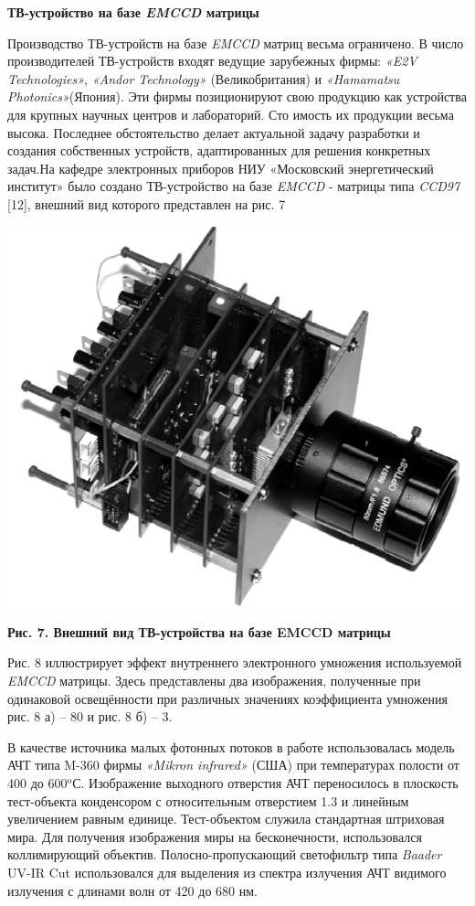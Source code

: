 \documentclass[11pt]{article}
\begin{document}
\begin{center}
\textbf{ТВ-устройство на базе \textit{EMCCD} матрицы}
\end{center}

Производство ТВ-устройств на базе \textit{EMCCD} матриц весьма ограничено. В число производителей ТВ-устройств входят ведущие зарубежных фирмы: \textit{«E2V Technologies»}, \textit{«Andor Technology»} (Великобритания) и \textit{«Hamamatsu Photonics»}(Япония). Эти фирмы позиционируют
свою продукцию как устройства для крупных научных центров и лабораторий. Сто
имость их продукции весьма высока. Последнее обстоятельство делает актуальной
задачу разработки и создания собственных устройств, адаптированных для решения конкретных задач.На кафедре электронных приборов НИУ «Московский энергетический институт» было создано ТВ-устройство на базе \textit{EMCCD} - матрицы типа \textit{CCD97} [12], внешний вид которого представлен на рис. 7

\includegraphics[width=0.8\linewidth]{11.png}
\begin{center}
\textbf{Рис. 7. Внешний вид ТВ-устройства на базе EMCCD матрицы}
\end{center}

Рис. 8 иллюстрирует эффект внутреннего электронного умножения используемой \textit{EMCCD} матрицы. Здесь представлены два изображения, полученные при одинаковой освещённости при различных значениях коэффициента умножения рис. 8 а) – 80 и рис. 8 б) – 3. 

В качестве источника малых фотонных потоков в работе использовалась модель АЧТ типа M-360 фирмы \textit{«Mikron infrared»} (США) при температурах полости от 400 до 600$^{\text{o}}$С. Изображение выходного отверстия АЧТ переносилось в плоскость тест-объекта конденсором с относительным отверстием 1.3 и линейным увеличением равным единице. Тест-объектом служила стандартная штриховая мира. Для получения изображения миры на бесконечности, использовался коллимирующий объектив. Полосно-пропускающий светофильтр типа \textit{Baader} UV-IR Cut использовался для выделения из спектра излучения АЧТ видимого излучения с длинами волн от 420 до 680 нм.
\end{document}
